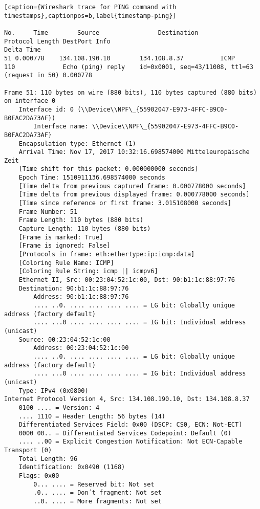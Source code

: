 \begin{lstlisting}[caption={Wireshark trace for PING command with timestamps},captionpos=b,label{timestamp-ping}]

No.     Time        Source                Destination           Protocol Length DestPort Info                                                            Delta Time
51 0.000778    134.108.190.10        134.108.8.37          ICMP     110             Echo (ping) reply    id=0x0001, seq=43/11008, ttl=63 (request in 50) 0.000778

Frame 51: 110 bytes on wire (880 bits), 110 bytes captured (880 bits) on interface 0
	Interface id: 0 (\\Device\\NPF\_{55902047-E973-4FFC-B9C0-B0FAC2DA73AF})
		Interface name: \\Device\\NPF\_{55902047-E973-4FFC-B9C0-B0FAC2DA73AF}
	Encapsulation type: Ethernet (1)
	Arrival Time: Nov 17, 2017 10:32:16.698574000 Mitteleuropäische Zeit
	[Time shift for this packet: 0.000000000 seconds]
	Epoch Time: 1510911136.698574000 seconds
	[Time delta from previous captured frame: 0.000778000 seconds]
	[Time delta from previous displayed frame: 0.000778000 seconds]
	[Time since reference or first frame: 3.015108000 seconds]
	Frame Number: 51
	Frame Length: 110 bytes (880 bits)
	Capture Length: 110 bytes (880 bits)
	[Frame is marked: True]
	[Frame is ignored: False]
	[Protocols in frame: eth:ethertype:ip:icmp:data]
	[Coloring Rule Name: ICMP]
	[Coloring Rule String: icmp || icmpv6]
	Ethernet II, Src: 00:23:04:52:1c:00, Dst: 90:b1:1c:88:97:76
	Destination: 90:b1:1c:88:97:76
		Address: 90:b1:1c:88:97:76
		.... ..0. .... .... .... .... = LG bit: Globally unique address (factory default)
		.... ...0 .... .... .... .... = IG bit: Individual address (unicast)
	Source: 00:23:04:52:1c:00
		Address: 00:23:04:52:1c:00
		.... ..0. .... .... .... .... = LG bit: Globally unique address (factory default)
		.... ...0 .... .... .... .... = IG bit: Individual address (unicast)
	Type: IPv4 (0x0800)
Internet Protocol Version 4, Src: 134.108.190.10, Dst: 134.108.8.37
	0100 .... = Version: 4
	.... 1110 = Header Length: 56 bytes (14)
	Differentiated Services Field: 0x00 (DSCP: CS0, ECN: Not-ECT)
	0000 00.. = Differentiated Services Codepoint: Default (0)
	.... ..00 = Explicit Congestion Notification: Not ECN-Capable Transport (0)
	Total Length: 96
	Identification: 0x0490 (1168)
	Flags: 0x00
		0... .... = Reserved bit: Not set
		.0.. .... = Don´t fragment: Not set
		..0. .... = More fragments: Not set

\end{lstlisting}
